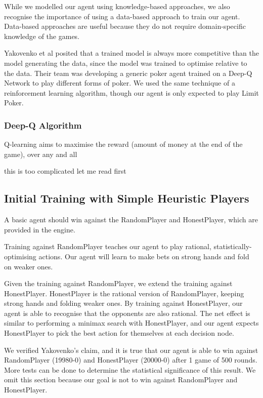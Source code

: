 \documentclass{article}
\begin{document}
While we modelled our agent using knowledge-based approaches, we also recognise the importance of using a data-based approach to train our agent. Data-based approaches are useful because they do not require domain-specific knowledge of the games.

Yakovenko et al posited that a trained model is always more competitive than the model generating the data, since the model was trained to optimise relative to the data. Their team was developing a generic poker agent trained on a Deep-Q Network to play different forms of poker. We used the same technique of a reinforcement learning algorithm, though our agent is only expected to play Limit Poker.

\subsubsection{Deep-Q Algorithm}
Q-learning aims to maximise the reward (amount of money at the end of the game), over any and all

this is too complicated let me read first


\subsection{Initial Training with Simple Heuristic Players}
A basic agent should win against the RandomPlayer and HonestPlayer, which are provided in the engine.

Training against RandomPlayer teaches our agent to play rational, statistically-optimising actions. Our agent will learn to make bets on strong hands and fold on weaker ones. 

Given the training against RandomPlayer, we extend the training against HonestPlayer. HonestPlayer is the rational version of RandomPlayer, keeping strong hands and folding weaker ones. By training against HonestPlayer, our agent is able to recognise that the opponents are also rational. The net effect is similar to performing a minimax search with HonestPlayer, and our agent expects HonestPlayer to pick the best action for themselves at each decision node.

We verified Yakovenko's claim, and it is true that our agent is able to win against RandomPlayer (19980-0) and HonestPlayer (20000-0) after 1 game of 500 rounds. More tests can be done to determine the statistical significance of this result. We omit this section because our goal is not to win against RandomPlayer and HonestPlayer.
\end{document}
